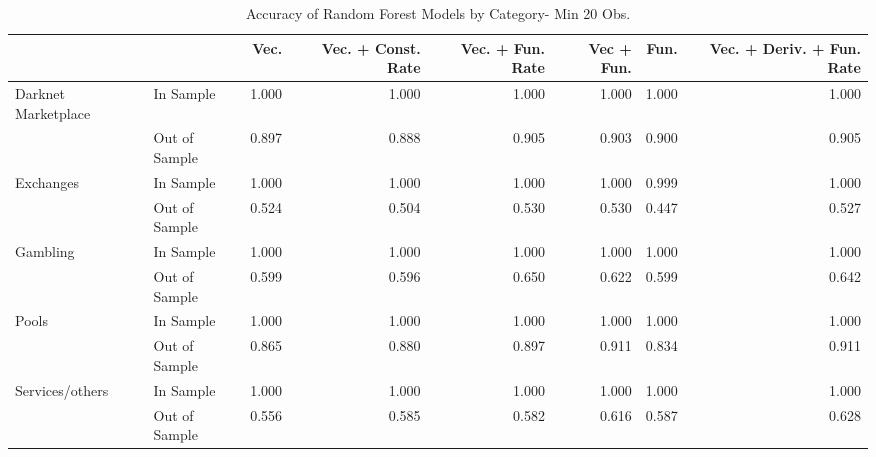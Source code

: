 \begin{table}[ht]
\centering
\begin{tabular}{llrrrrrr}
  \hline
 &  & Vec. & Vec. + Const. Rate & Vec. + Fun. Rate & Vec + Fun. & Fun. & Vec. + Deriv. + Fun. Rate \\ 
  \hline
Darknet Marketplace & In Sample & 1.000 & 1.000 & 1.000 & 1.000 & 1.000 & 1.000 \\ 
   & Out of Sample & 0.897 & 0.888 & 0.905 & 0.903 & 0.900 & 0.905 \\ 
  Exchanges & In Sample & 1.000 & 1.000 & 1.000 & 1.000 & 0.999 & 1.000 \\ 
   & Out of Sample & 0.524 & 0.504 & 0.530 & 0.530 & 0.447 & 0.527 \\ 
  Gambling & In Sample & 1.000 & 1.000 & 1.000 & 1.000 & 1.000 & 1.000 \\ 
   & Out of Sample & 0.599 & 0.596 & 0.650 & 0.622 & 0.599 & 0.642 \\ 
  Pools & In Sample & 1.000 & 1.000 & 1.000 & 1.000 & 1.000 & 1.000 \\ 
   & Out of Sample & 0.865 & 0.880 & 0.897 & 0.911 & 0.834 & 0.911 \\ 
  Services/others & In Sample & 1.000 & 1.000 & 1.000 & 1.000 & 1.000 & 1.000 \\ 
   & Out of Sample & 0.556 & 0.585 & 0.582 & 0.616 & 0.587 & 0.628 \\ 
   \hline
\end{tabular}
\caption{Accuracy of Random Forest Models by Category- Min 20 Obs.} 
\label{rf_20obs_acc_cat}
\end{table}
